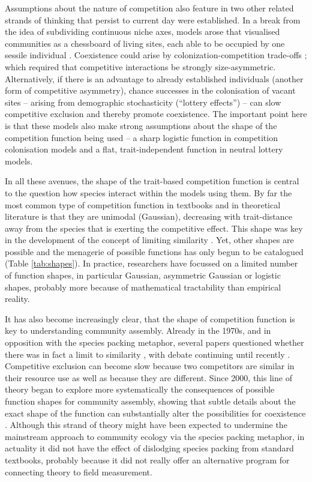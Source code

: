 \documentclass[a4paper,11pt]{article}
\begin{document}
Assumptions about the nature of competition also feature in two other
related strands of thinking that persist to current day were established. In
a break from the idea of subdividing continuous
niche axes, models arose
that visualised communities as a chessboard of living sites, each able to be
occupied by one sessile individual \citep{Yodzis-1978}. Coexistence could
arise by colonization-competition trade-offs \citep{Levins-1971,
Geritz-1999, Calcagno-2006}; which required that competitive interactions
be strongly size-asymmetric. Alternatively, if there is an advantage to
already established individuals (another form of competitive asymmetry),
chance successes in the colonisation of vacant sites  -- arising from
demographic stochasticity
(``lottery effects'') \citep {Sale-1977, Hubbell-2001} -- can slow
competitive exclusion and thereby promote coexistence.
%
The important point here is that these models also make strong assumptions
about the shape of the competition function being used -- a sharp
logistic function in competition colonisation models and a
flat, trait-independent function in neutral lottery models.

In all these avenues, the shape of the trait-based competition function
is central to the question how
species interact within the models using them.
%
By far the most common type of competition function in textbooks and in
theoretical literature is that they are unimodal (Gaussian),
decreasing with trait-distance away from the species that is exerting
the competitive effect. This shape was key in the development of
the concept of limiting similarity \citep{MacArthur-1967}.
Yet, other shapes are possible  and the menagerie of possible
functions has only begun to be catalogued \citep{Barabas-2012,Leimar-2013}
(Table \ref{tab:shapes}). In practice, researchers have focussed on
a limited number of function shapes, in particular Gaussian,
asymmetric Gaussian or logistic shapes, probably more because of
mathematical tractability than empirical reality.

It has also become increasingly clear, that the shape of competition
function is key to understanding community assembly. Already in the
1970s, and in opposition with the species packing metaphor, several papers
questioned whether there was in fact a limit to similarity
\citep{May-1972, Abrams-1975, Abrams-1983}, with debate continuing
until recently \citep{Meszena-2006, Barabas-2012, Leimar-2013}.
Competitive exclusion can become slow because two
competitors are similar in their resource use as well as because they
are different. Since 2000, this line of theory began to explore more
systematically the consequences of possible function shapes for
community assembly, showing that subtle details about the exact shape of the
function can substantially alter the possibilities for coexistence
\citep{Calcagno-2006, Scheffer-2006, Pigolotti-2007,
 Barabas-2012,Barabas-2013,DAndrea-2013,Leimar-2013}.
Although this strand of theory might have been expected to undermine
the mainstream approach to community ecology via the species packing
metaphor, in actuality it did not have the effect of dislodging
species packing from standard textbooks, probably because it did not
really offer an alternative program for connecting theory to field
measurement.
\end{document}
